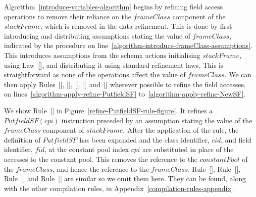 Algorithm~\ref{introduce-variables-algorithm} begins by refining field
access operations to remove their reliance on the $frameClass$
component of the $stackFrame$, which is removed in the data
refinement.
This is done by first introducing and distributing assumptions stating
the value of $frameClass$, indicated by the procedure
 on
line~\ref{algorithm-introduce-frameClass-assumptions}.
This introduces assumptions from the schema actions initialising
$stackFrame$, using Law~[], and
distributing it using standard refinement laws.
This is straightforward as none of the operations affect the value of
$frameClass$.
We can then apply Rules~[],
[],
[],
[] and~[]
wherever possible to refine the field accesses, on
lines~\ref{algorithm-apply-refine-PutfieldSF}
to~\ref{algorithm-apply-refine-NewSF}.

We show Rule~[] in
Figure~\ref{refine-PutfieldSF-rule-figure}.
It refines a $PutfieldSF(cpi)$ instruction preceded by an assumption
stating the value of the $frameClass$ component of $stackFrame$.
After the application of the rule, the definition of $PutfieldSF$ has
been expanded and the class identifier, $cid$, and field identifier,
$fid$, at the constant pool index $cpi$ are substituted in place of
the accesses to the constant pool.
This removes the reference to the $constantPool$ of the $frameClass$,
and hence the reference to the $frameClass$.
Rule~[],
Rule~[],
Rule~[] and
Rule~[] are similar so we omit them
here.
They can be found, along with the other compilation rules, in
Appendix~\ref{compilation-rules-appendix}.

